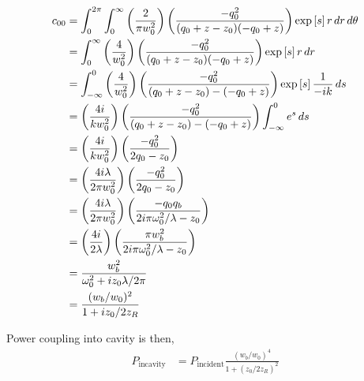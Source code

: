 \begin{align}
    c_{00} &= \int^{2 \pi}_{0} \int^{\infty}_{0}  \left( \frac{2}{\pi w^2_0} \right)
    \left( \frac{-q^2_0}{(q_0+z-z_0)(-q_0+z)} \right)
    \exp \left[
    s
    \right] r \,dr \,d\theta
\\  &= \int^{\infty}_{0} \left( \frac{4}{w^2_0} \right)
    \left( \frac{-q^2_0}{(q_0+z-z_0)(-q_0+z)} \right)
    \exp \left[
    s
    \right] r \,dr
\\  &= \int^{0}_{-\infty} \left( \frac{4}{w^2_0} \right)
    \left( \frac{-q^2_0}{(q_0+z-z_0)-(-q_0+z)} \right)
    \exp \left[ s
    \right] \frac{1}{-ik} \,ds
\\  &= \left( \frac{4i}{kw^2_0} \right)
    \left( \frac{-q^2_0}{(q_0+z-z_0)-(-q_0+z)} \right)
    \int^0_{-\infty} e^s \,ds
\\  &= \left( \frac{4i}{kw^2_0} \right)
    \left( \frac{-q^2_0}{2q_0-z_0} \right)
\\  &= \left( \frac{4i \lambda}{2 \pi w^2_0} \right)
    \left( \frac{-q^2_0}{2q_0-z_0} \right)
\\  &= \left( \frac{4i \lambda}{2 \pi w^2_0} \right)
    \left( \frac{-q_0 q_b}{2i \pi \omega^2_0 / \lambda - z_0} \right)
\\  &= \left( \frac{4i}{2 \lambda} \right)
    \left( \frac{\pi w_b^2}{2i \pi \omega^2_0 / \lambda - z_0} \right)
\\  &= 
    \frac{w_b^2}{\omega^2_0 + i z_0 \lambda /2 \pi}
\\  &= \frac{(w_b/w_0)^2}{1 + i z_0 /2 z_R}
\end{align}

Power coupling into cavity is then,
\begin{align}
P_{\mathrm{in cavity}} &= P_{\mathrm{incident}} \frac{(w_b/w_0)^4}{1+(z_0/2z_R)^2}
\end{align}


